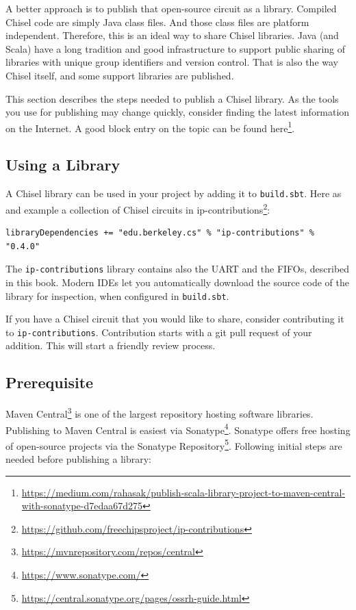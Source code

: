 \documentclass[%
    10pt,
    headinclude, footexclude,
    openright, %
    notitlepage,
    cleardoubleempty,
    headsepline,
    pointlessnumbers,
    bibtotoc, idxtotoc,
    ]{scrbook}
\newcommand{\code}[1]{{\small{\texttt{#1}}}}
\newcommand{\myref}[2]{\href{#1}{#2}}
\renewcommand{\myref}[2]{{#2}{\footnote{\url{#1}}}}
\begin{document}
A better approach is to publish that open-source circuit as a library.
Compiled Chisel code are simply Java class files. And those class files are
platform independent. Therefore, this is an ideal way to share Chisel libraries.
Java (and Scala) have a long tradition and good infrastructure to support
public sharing of libraries with unique group identifiers and version control.
That is also the way Chisel itself, and some support libraries are published.

This section describes the steps needed to publish a Chisel library. As the tools you
use for publishing may change quickly, consider finding the latest information on the
Internet. A good block entry on the topic can be found
\myref{https://medium.com/rahasak/publish-scala-library-project-to-maven-central-with-sonatype-d7edaa67d275}{here}.

\subsection{Using a Library}

A Chisel library can be used in your project by adding it to \code{build.sbt}. Here as and
example a collection of Chisel circuits in \myref{https://github.com/freechipsproject/ip-contributions}{ip-contributions}:

\begin{verbatim}
libraryDependencies += "edu.berkeley.cs" % "ip-contributions" % "0.4.0"
\end{verbatim}

\noindent The \code{ip-contributions} library contains also the UART and the FIFOs, described in this book.
Modern IDEs let you automatically download the source code of the library for inspection, when configured
in \code{build.sbt}.

If you have a Chisel circuit that you would like to share, consider contributing it to \code{ip-contributions}.
Contribution starts with a git pull request of your addition. This will start a friendly review process.

\subsection{Prerequisite}

\myref{https://mvnrepository.com/repos/central}{Maven Central} is one of the largest repository
hosting software libraries. Publishing to Maven Central is easiest via
\myref{https://www.sonatype.com/}{Sonatype}. Sonatype offers free hosting of open-source
projects via the \myref{https://central.sonatype.org/pages/ossrh-guide.html}{Sonatype Repository}.
Following initial steps are needed before publishing a library:
\end{document}
